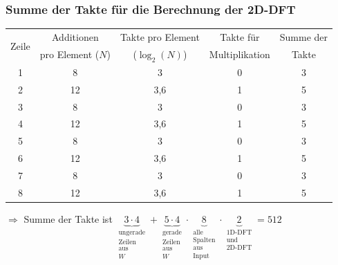 \begin{frame}\frametitle{Summe der Takte für die Berechnung der 2D-DFT}
\begin{table}[ht!]
\centering
\begin{tabular}{ccccc}
\hline
\multirow{2}{*}{Zeile} & Additionen & Takte pro Element & Takte für & Summe der\\
     & pro Element ($N$) & ($\log_2(N)$) & Multiplikation & Takte\\
\hline
1& 8  & 3   &0 &3\\
2& 12 & 3,6 &1 &5\\
3& 8  & 3   &0 &3\\
4& 12 & 3,6 &1 &5\\
5& 8  & 3   &0 &3\\
6& 12 & 3,6 &1 &5\\
7& 8  & 3   &0 &3\\
8& 12 & 3,6 &1 &5\\
\hline
\end{tabular}
\end{table}
\medskip
\begin{center}
$\Rightarrow$ Summe der Takte ist $\underbrace{3 \cdot 4}_{\substack{\textrm{ungerade}\\\textrm{Zeilen}\\\textrm{aus}\\W}}  + \underbrace{5 \cdot 4}_{\substack{\textrm{gerade}\\\textrm{Zeilen}\\\textrm{aus}\\W}} \cdot \underbrace{8}_{\substack{\textrm{alle}\\\textrm{Spalten}\\\textrm{aus}\\\textrm{Input}}} \cdot \underbrace{2}_{\substack{\textrm{1D-DFT}\\\textrm{und}\\\textrm{2D-DFT}}} = 512$ 
\end{center}
\end{frame}



